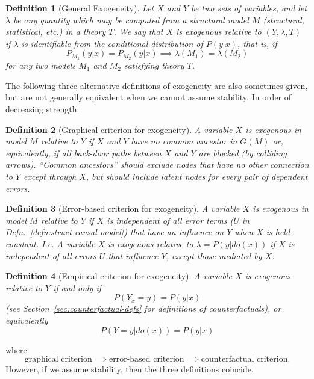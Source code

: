 \documentclass[11pt]{article}
\numberwithin{equation}{section}
\newtheorem{defn}{Definition}[section]
\begin{document}
\begin{defn}[General Exogeneity]
Let $X$ and $Y$ be two sets of variables, and let $\lambda$ be any quantity which may be computed from a structural model $M$ (structural, statistical, etc.) in a theory $T$. We say that $X$ is exogenous relative to $(Y, \lambda ,T)$ if $\lambda$ is identifiable from the conditional distribution of $P(y|x)$, that is, if
\begin{equation}
P_{M_1}(y|x) = P_{M_2}(y|x) \implies \lambda(M_1) = \lambda(M_2)
\end{equation}
for any two models $M_1$ and $M_2$ satisfying theory $T$. \label{def:general-exog}
\end{defn}

The following three alternative definitions of exogeneity are also sometimes given, but are not generally equivalent when we cannot assume stability. In order of decreasing strength:
\begin{defn}[Graphical criterion for exogeneity]
A variable $X$ is exogenous in model $M$ relative to $Y$ if $X$ and $Y$ have no common ancestor in $G(M)$ or, equivalently, if all back-door paths between $X$ and $Y$ are blocked (by colliding arrows). ``Common ancestors'' should exclude nodes that have no other connection to $Y$ except through $X$, but should include latent nodes for every pair of dependent errors.
\end{defn}
\begin{defn}[Error-based criterion for exogeneity]
A variable $X$ is exogenous in model $M$ relative to $Y$ if $X$ is independent of all error terms ($U$ in Defn.~\ref{defn:struct-causal-model}) that have an influence on $Y$ when $X$ is held constant. I.e. A variable $X$ is exogenous relative to $\lambda=P(y|do(x))$ if $X$ is independent of all errors $U$ that influence $Y$, except those mediated by $X$.
\end{defn}
\begin{defn}[Empirical criterion for exogeneity]
A variable $X$ is exogenous relative to $Y$ if and only if 
\begin{equation}
P(Y_x=y)=P(y|x)
\end{equation}
(see Section~\ref{sec:counterfactual-defs} for definitions of counterfactuals), or equivalently
\begin{equation}
P(Y=y|do(x))=P(y|x)
\end{equation}
\end{defn}
\noindent where
\begin{equation}
\text{graphical criterion} \implies \text{error-based criterion} \implies \text{counterfactual criterion}.
\end{equation}
However, if we assume stability, then the three definitions coincide.
\end{document}
